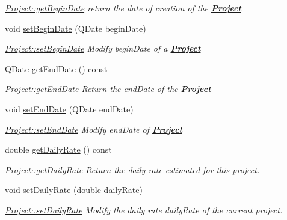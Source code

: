 \begin{DoxyCompactItemize}
\begin{DoxyCompactList}\small\item\em \hyperlink{classModels_1_1Project_a31b8e46aabb1327499f7e36f170900e3}{Project\-::get\-Begin\-Date} return the date of creation of the {\bfseries \hyperlink{classModels_1_1Project}{Project}} \end{DoxyCompactList}\item 
void \hyperlink{classModels_1_1Project_a07dfb00cbec7442197a91bc0795ab14d}{set\-Begin\-Date} (Q\-Date begin\-Date)
\begin{DoxyCompactList}\small\item\em \hyperlink{classModels_1_1Project_a07dfb00cbec7442197a91bc0795ab14d}{Project\-::set\-Begin\-Date} Modify {\itshape begin\-Date} of a {\bfseries \hyperlink{classModels_1_1Project}{Project}} \end{DoxyCompactList}\item 
Q\-Date \hyperlink{classModels_1_1Project_aaf6792d15dcd65c3708e4a01b80e3108}{get\-End\-Date} () const 
\begin{DoxyCompactList}\small\item\em \hyperlink{classModels_1_1Project_aaf6792d15dcd65c3708e4a01b80e3108}{Project\-::get\-End\-Date} Return the {\itshape end\-Date} of the {\bfseries \hyperlink{classModels_1_1Project}{Project}} \end{DoxyCompactList}\item 
void \hyperlink{classModels_1_1Project_a89e9603b862d0a282e4eb03e122e8c05}{set\-End\-Date} (Q\-Date end\-Date)
\begin{DoxyCompactList}\small\item\em \hyperlink{classModels_1_1Project_a89e9603b862d0a282e4eb03e122e8c05}{Project\-::set\-End\-Date} Modify {\itshape end\-Date} of {\bfseries \hyperlink{classModels_1_1Project}{Project}} \end{DoxyCompactList}\item 
double \hyperlink{classModels_1_1Project_a46d74a7452e712d223f1ca444a4cc180}{get\-Daily\-Rate} () const 
\begin{DoxyCompactList}\small\item\em \hyperlink{classModels_1_1Project_a46d74a7452e712d223f1ca444a4cc180}{Project\-::get\-Daily\-Rate} Return the daily rate estimated for this project. \end{DoxyCompactList}\item 
void \hyperlink{classModels_1_1Project_a9bc03d9632334a550bd25f6286d2c7a2}{set\-Daily\-Rate} (double daily\-Rate)
\begin{DoxyCompactList}\small\item\em \hyperlink{classModels_1_1Project_a9bc03d9632334a550bd25f6286d2c7a2}{Project\-::set\-Daily\-Rate} Modify the daily rate {\itshape daily\-Rate} of the current project. \end{DoxyCompactList}\item 

\end{DoxyCompactItemize}

